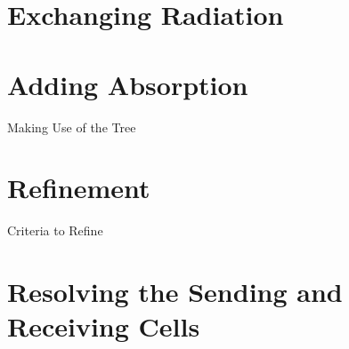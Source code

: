 \section{Exchanging Radiation}



\section{Adding Absorption}

Making Use of the Tree

\section{Refinement}

Criteria to Refine

\section{Resolving the Sending and Receiving Cells}
